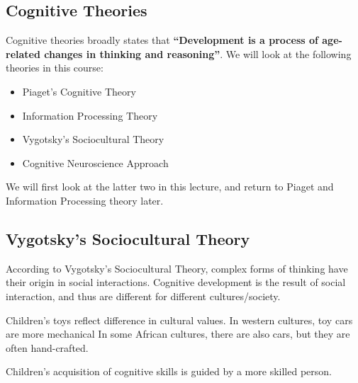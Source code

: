 \documentclass[../main/main.tex]{subfiles}
\begin{document}
\subsection{Cognitive Theories}

Cognitive theories broadly states that \textbf{``Development is a process of age-related changes in thinking and reasoning''}. We will look at the following theories in this course:
\begin{itemize}
\item Piaget's Cognitive Theory
\item Information Processing Theory
\item Vygotsky's Sociocultural Theory
\item Cognitive Neuroscience Approach
\end{itemize}
We will first look at the latter two in this lecture, and return to Piaget and Information Processing theory later.
\subsection{Vygotsky's Sociocultural Theory}
According to Vygotsky's Sociocultural Theory, complex forms of thinking have their origin in social interactions. Cognitive development is the result of social interaction, and thus are different for different cultures/society.
\begin{example}
  Children's toys reflect difference in cultural values. In western cultures, toy cars are more mechanical
  In some African cultures, there are also cars, but they are often hand-crafted.
\end{example}
Children's acquisition of cognitive skills is guided by a more skilled person.
\end{document}
